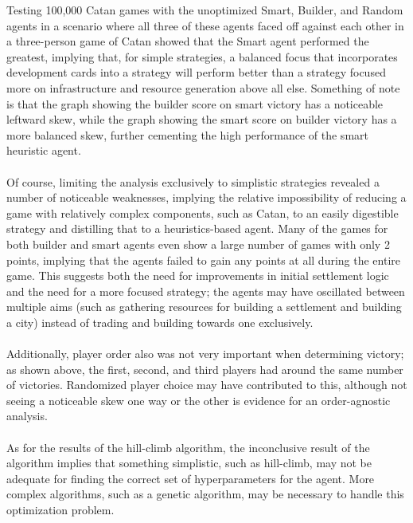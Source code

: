 \documentclass[a4paper, 11pt]{article}
\begin{document}
Testing 100,000 Catan games with the unoptimized Smart, Builder, and Random agents in a scenario where all three of these agents faced off against each other in a three-person game of Catan showed that the Smart agent performed the greatest, implying that, for simple strategies, a balanced focus that incorporates development cards into a strategy will perform better than a strategy focused more on infrastructure and resource generation above all else. Something of note is that the graph showing the builder score on smart victory has a noticeable leftward skew, while the graph showing the smart score on builder victory has a more balanced skew, further cementing the high performance of the smart heuristic agent.
\\ \\
\noindent Of course, limiting the analysis exclusively to simplistic strategies revealed a number of noticeable weaknesses, implying the relative impossibility of reducing a game with relatively complex components, such as Catan, to an easily digestible strategy and distilling that to a heuristics-based agent. Many of the games for both builder and smart agents even show a large number of games with only 2 points, implying that the agents failed to gain any points at all during the entire game. This suggests both the need for improvements in initial settlement logic and the need for a more focused strategy; the agents may have oscillated between multiple aims (such as gathering resources for building a settlement and building a city) instead of trading and building towards one exclusively. 
\\ \\
\noindent Additionally, player order also was not very important when determining victory; as shown above, the first, second, and third players had around the same number of victories. Randomized player choice may have contributed to this, although not seeing a noticeable skew one way or the other is evidence for an order-agnostic analysis.
\\ \\
\noindent As for the results of the hill-climb algorithm, the inconclusive result of the algorithm implies that something simplistic, such as hill-climb, may not be adequate for finding the correct set of hyperparameters for the agent. More complex algorithms, such as a genetic algorithm, may be necessary to handle this optimization problem.
\end{document}
